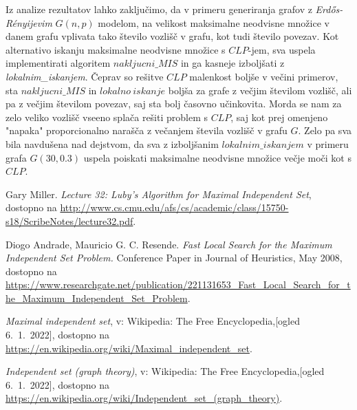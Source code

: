 \documentclass[a4paper, 12pt]{article}
\begin{document}
Iz analize rezultatov lahko zaključimo, da v primeru generiranja grafov z \textit{Erdős-Rényijevim} $G(n, p)$ modelom, na velikost maksimalne neodvisne množice v danem grafu
vplivata tako število vozlišč v grafu, kot tudi število povezav. Kot alternativo iskanju maksimalne neodvisne množice s $CLP$-jem, sva uspela implementirati algoritem $nakljucni\_MIS$
in ga kasneje izboljšati z \textit{lokalnim\_iskanjem}. Čeprav so rešitve $CLP$ malenkost boljše v večini primerov, sta $nakljucni\_MIS$ in $lokalno\ iskanje$ boljša za grafe z večjim številom vozlišč,
ali pa z večjim številom povezav, saj sta bolj časovno učinkovita. Morda se nam za zelo veliko vozlišč vseeno splača rešiti problem s $CLP$, saj kot prej omenjeno "napaka" proporcionalno narašča z večanjem števila vozlišč v grafu $G$.
Zelo pa sva bila navdušena nad dejstvom, da sva z izboljšanim $lokalnim\_iskanjem$ v primeru grafa $G(30,0.3)$ uspela poiskati maksimalne neodvisne množice večje moči kot s $CLP$.


\newpage

\begin{thebibliography}{9}    

    Gary Miller.
    \textit{Lecture 32: Luby’s Algorithm for Maximal Independent Set}, dostopno na \url{http://www.cs.cmu.edu/afs/cs/academic/class/15750-s18/ScribeNotes/lecture32.pdf}.

    Diogo Andrade, Mauricio G. C. Resende.
    \textit{Fast Local Search for the Maximum Independent Set Problem.} Conference Paper in Journal of Heuristics, May 2008, 
    dostopno na \url{https://www.researchgate.net/publication/221131653_Fast_Local_Search_for_the_Maximum_Independent_Set_Problem}.

    \textit{Maximal independent set}, v: Wikipedia: The Free Encyclopedia,[ogled 6.~1.~2022], dostopno na \url{https://en.wikipedia.org/wiki/Maximal_independent_set}.

    \textit{Independent set (graph theory)}, v: Wikipedia: The Free Encyclopedia,[ogled 6.~1.~2022], dostopno na \url{https://en.wikipedia.org/wiki/Independent_set_(graph_theory)}.

    
\end{thebibliography}
\end{document}
